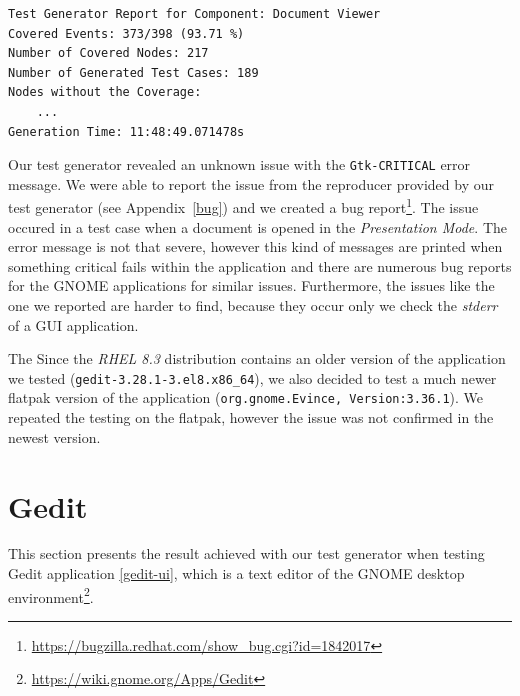 \begin{minipage}\linewidth
\begin{lstlisting}[caption={Final test generator report for LibreOffice StartCenter},label={evince-report}]
Test Generator Report for Component: Document Viewer
Covered Events: 373/398 (93.71 %)
Number of Covered Nodes: 217
Number of Generated Test Cases: 189
Nodes without the Coverage:
    ...
Generation Time: 11:48:49.071478s
\end{lstlisting}
\end{minipage}

Our test generator revealed an unknown issue with the \texttt{Gtk-CRITICAL} error message. We were able to report the issue from the reproducer provided by our test generator (see Appendix~\ref{bug}) and we created a bug report\footnote{\url{https://bugzilla.redhat.com/show_bug.cgi?id=1842017}}. The issue occured in a test case when a document is opened in the \textit{Presentation Mode}. The error message is not that severe, however this kind of messages are printed when something critical fails within the application and there are numerous bug reports for the GNOME applications for similar issues. Furthermore, the issues like the one we reported are harder to find, because they occur only we check the \textit{stderr} of a GUI application.

The Since the \textit{RHEL 8.3} distribution contains an older version of the application we tested (\texttt{gedit-3.28.1-3.el8.x86\_64}), we also decided to test a much newer flatpak version of the application (\texttt{org.gnome.Evince, Version:3.36.1}). We repeated the testing on the flatpak, however the issue was not confirmed in the newest version. 




\section{Gedit}\label{gedit}
This section presents the result achieved with our test generator when testing Gedit application \ref{gedit-ui}, which is a text editor of the GNOME desktop environment\footnote{\url{https://wiki.gnome.org/Apps/Gedit}}. 


